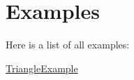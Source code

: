 \section{Examples}
Here is a list of all examples\+:\begin{DoxyCompactItemize}
\item 
\hyperlink{TriangleExample-example}{Triangle\+Example}
\end{DoxyCompactItemize}
